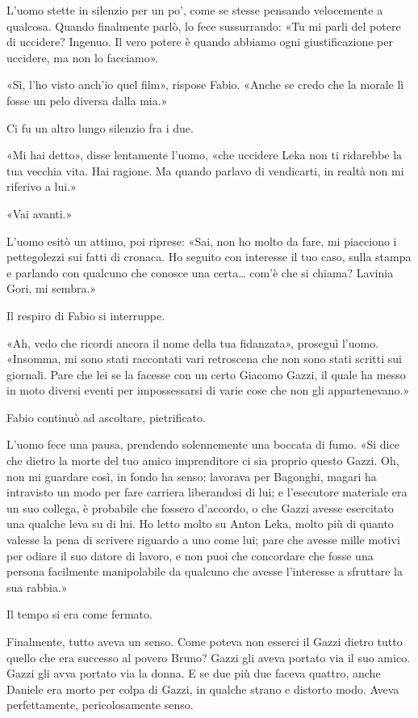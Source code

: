 L'uomo stette in silenzio per un po', come se stesse pensando velocemente a qualcosa. Quando finalmente parlò, lo fece sussurrando: «Tu mi parli del potere di uccidere? Ingenuo. Il vero potere è quando abbiamo ogni giustificazione per uccidere, ma non lo facciamo».

«Sì, l'ho visto anch'io quel film», rispose Fabio. «Anche se credo che la morale lì fosse un pelo diversa dalla mia.»

Ci fu un altro lungo silenzio fra i due.

«Mi hai detto», disse lentamente l'uomo, «che uccidere Leka non ti ridarebbe la tua vecchia vita. Hai ragione. Ma quando parlavo di vendicarti, in realtà non mi riferivo a lui.»

«Vai avanti.»

L'uomo esitò un attimo, poi riprese: «Sai, non ho molto da fare, mi piacciono i pettegolezzi sui fatti di cronaca. Ho seguito con interesse il tuo caso, sulla stampa e parlando con qualcuno che conosce una
certa\ldots{} com'è che si chiama? Lavinia Gori, mi sembra.» 

Il respiro di Fabio si interruppe.

«Ah, vedo che ricordi ancora il nome della tua fidanzata», proseguì l'uomo. «Insomma, mi sono stati raccontati vari retroscena che non sono stati scritti sui giornali. Pare che lei se la facesse con un certo Giacomo Gazzi, il quale ha messo in moto diversi eventi per impossessarsi di varie cose che non gli appartenevano.»

Fabio continuò ad ascoltare, pietrificato.

L'uomo fece una pausa, prendendo solennemente una boccata di fumo. «Si dice che dietro la morte del tuo amico imprenditore ci sia proprio questo Gazzi. Oh, non mi guardare così, in fondo ha senso: lavorava per Bagonghi, magari ha intravisto un modo per fare carriera liberandosi di lui; e l'esecutore materiale era un suo collega, è probabile che fossero d'accordo, o che Gazzi avesse esercitato una qualche leva su di lui. Ho letto molto su Anton Leka, molto più di quanto valesse la pena di scrivere riguardo a uno come lui; pare che avesse mille motivi per odiare il suo datore di lavoro, e non puoi che concordare che fosse una persona facilmente manipolabile da qualcuno che avesse l'interesse a sfruttare la sua rabbia.»

Il tempo si era come fermato.

Finalmente, tutto aveva un senso. Come poteva non esserci il Gazzi dietro tutto quello che era successo al povero Bruno? Gazzi gli aveva portato via il suo amico. Gazzi gli avva portato via la donna. E se due più due faceva quattro, anche Daniele era morto per colpa di Gazzi, in qualche strano e distorto modo. Aveva perfettamente, pericolosamente senso.

